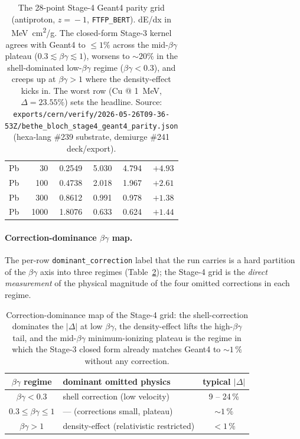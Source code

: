 \begin{table}[h]
\begin{tabular}{@{}l r r r r r@{}}
Pb & 30   & 0.2549 & 5.030   & 4.794   & $+4.93$  \\
Pb & 100  & 0.4738 & 2.018   & 1.967   & $+2.61$  \\
Pb & 300  & 0.8612 & 0.991   & 0.978   & $+1.38$  \\
Pb & 1000 & 1.8076 & 0.633   & 0.624   & $+1.44$  \\
\bottomrule
\end{tabular}
\caption{The 28-point Stage-4 Geant4 parity grid (antiproton, $z\!=\!-1$,
\texttt{FTFP\_BERT}). dE/dx in \si{MeV.cm^2/g}. The closed-form
Stage-3 kernel agrees with Geant4 to $\le\!1\%$ across the mid-$\beta\gamma$
plateau ($0.3\!\lesssim\!\beta\gamma\!\lesssim\!1$), worsens to
$\sim\!20\%$ in the shell-dominated low-$\beta\gamma$ regime
($\beta\gamma\!<\!0.3$), and creeps up at $\beta\gamma\!>\!1$ where the
density-effect kicks in. The worst row (Cu @ \SI{1}{MeV},
$\Delta\!=\!23.55\%$) sets the headline. Source:
\texttt{exports/cern/verify/2026-05-26T09-36-53Z/bethe\_bloch\_stage4\_geant4\_parity.json}
(hexa-lang \#239 substrate, demiurge \#241 deck/export).}
\label{tab:app-bethe-stage4}
\end{table}

\paragraph{Correction-dominance $\beta\gamma$ map.} The per-row
\texttt{dominant\_correction} label that the run carries is a hard
partition of the $\beta\gamma$ axis into three regimes
(Table~\ref{tab:app-bethe-bg-regimes}); the Stage-4 grid is the
\emph{direct measurement} of the physical magnitude of the four omitted
corrections in each regime.

\begin{table}[h]
\centering
\small
\begin{tabular}{@{}c l c@{}}
\toprule
$\beta\gamma$ regime & dominant omitted physics & typical $|\Delta|$ \\
\midrule
$\beta\gamma < 0.3$        & shell correction (low velocity)         & 9 -- 24\,\% \\
$0.3 \le \beta\gamma \le 1$ & --- (corrections small, plateau)        & $\sim\!1\,\%$ \\
$\beta\gamma > 1$          & density-effect (relativistic restricted) & $< 1\,\%$  \\
\bottomrule
\end{tabular}
\caption{Correction-dominance map of the Stage-4 grid: the
shell-correction dominates the $|\Delta|$ at low $\beta\gamma$, the
density-effect lifts the high-$\beta\gamma$ tail, and the mid-$\beta\gamma$
minimum-ionizing plateau is the regime in which the Stage-3 closed form
already matches Geant4 to $\sim\!1\,\%$ without any correction.}
\label{tab:app-bethe-bg-regimes}
\end{table}

